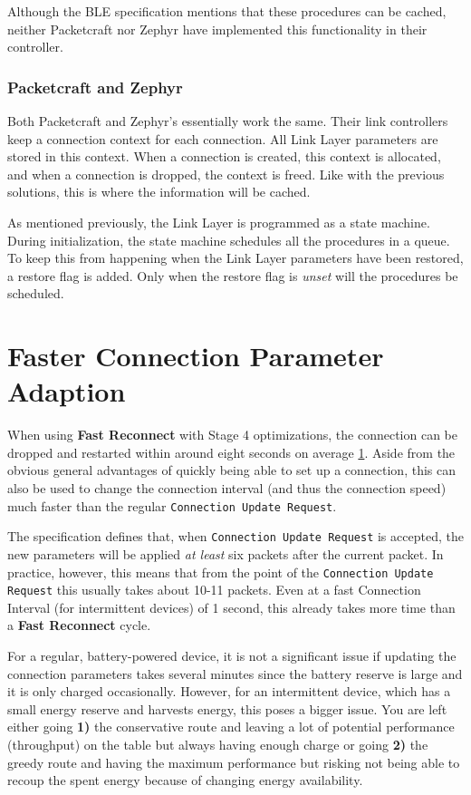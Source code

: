 Although the BLE specification mentions that these procedures can be cached, neither Packetcraft nor Zephyr have implemented this functionality in their controller. 

\subsubsection{Packetcraft and Zephyr}
Both Packetcraft and Zephyr's essentially work the same. Their link controllers keep a connection context for each connection. All Link Layer parameters are stored in this context. When a connection is created, this context is allocated, and when a connection is dropped, the context is freed. Like with the previous solutions, this is where the information will be cached.

As mentioned previously, the Link Layer is programmed as a state machine. During initialization, the state machine schedules all the procedures in a queue. To keep this from happening when the Link Layer parameters have been restored, a restore flag is added. Only when the restore flag is \textit{unset} will the procedures be scheduled.

\section{Faster Connection Parameter Adaption}
When using \textbf{Fast Reconnect} with Stage 4 optimizations, the connection can be dropped and restarted within around eight seconds on average \ref{}. Aside from the obvious general advantages of quickly being able to set up a connection, this can also be used to change the connection interval (and thus the connection speed) much faster than the regular \texttt{Connection Update Request}.

The specification defines that, when \texttt{Connection Update Request} is accepted, the new parameters will be applied \textit{at least} six packets after the current packet. In practice, however, this means that from the point of the \texttt{Connection Update Request} this usually takes about 10-11 packets. Even at a fast Connection Interval (for intermittent devices) of 1 second, this already takes more time than a \textbf{Fast Reconnect} cycle. 

For a regular, battery-powered device, it is not a significant issue if updating the connection parameters takes several minutes since the battery reserve is large and it is only charged occasionally. However, for an intermittent device, which has a small energy reserve and harvests energy, this poses a bigger issue. You are left either going \textbf{1)} the conservative route and leaving a lot of potential performance (throughput) on the table but always having enough charge or going \textbf{2)} the greedy route and having the maximum performance but risking not being able to recoup the spent energy because of changing energy availability.

